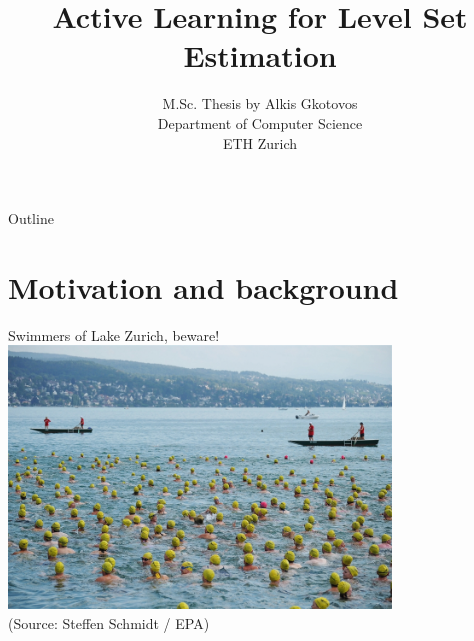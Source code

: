 \documentclass[10pt,mathserif,serif,handout]{beamer}
\title[Active Learning for Level Set Estimation]
{Active Learning for Level Set Estimation}
\author[Alkis Gkotovos]{
\footnotesize
M.Sc. Thesis by Alkis Gkotovos\\
Department of Computer Science\\
ETH Zurich
}
\date[M.Sc. Thesis presentation]{
\footnotesize
Supervised by Prof. Andreas Krause

}
\begin{document}
\begin{frame}
  \titlepage
\end{frame}

\begin{frame}{Outline}
  \tableofcontents
\end{frame}


\section{Motivation and background}

\begin{frame}
\begin{center}
Swimmers of Lake Zurich, beware!\\
\vspace{0.2in}
\includegraphics[width=4in]{figures/swimmers.jpg}\\[-0.5em]
{\tiny (Source: Steffen Schmidt / EPA)}
\end{center}
\end{frame}
\end{document}
